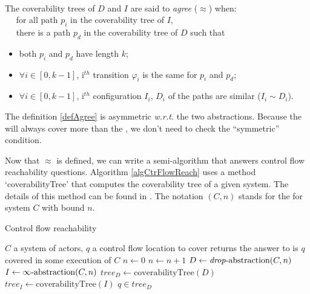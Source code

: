 \documentclass[a4paper]{report}
\numberwithin{algorithm}{chapter}
\begin{document}
\begin{define}[$\approx$] \mbox{}\\
\label{defAgree}
The coverability trees of \dabs{} $D$ and \iabs{} $I$ are said to \emph{agree} ($\approx$) when:\\
\mbox{} ~~ for all path $p_i$ in the coverability tree of $I$, \\
\mbox{} ~~ there is a path $p_d$ in the coverability tree of $D$ such that
\begin{itemize}
\item both $p_i$ and $p_d$ have length $k$;
\item $\forall i \in [0,k-1]$, i$^{th}$ transition $\varphi_i$ is the same for $p_i$ and $p_d$;
\item $\forall i \in [0,k-1]$, i$^{th}$ configuration $I_i$, $D_i$ of the paths are similar ($I_i \sim D_i$).
\end{itemize}
\end{define}

\begin{rem}
The definition \ref{defAgree} is asymmetric \emph{w.r.t.} the two abstractions.
Because the \iabs{} will always cover more than the \dabs{}, we don't need to check the ``symmetric'' condition.
\end{rem}

Now that $\approx$ is defined, we can write a semi-algorithm that answers control flow reachability questions.
Algorithm \ref{algCtrFlowReach} uses a method `coverabilityTree' that computes the coverability tree of a given system.
The details of this method can be found in \cite{DBLP:journals/jcss/KarpM69,DBLP:conf/icalp/Finkel87,DBLP:conf/apn/Finkel91}.
The notation \iabs{}$(C,n)$ stands for the \iabs{} for system $C$ with bound $n$.

\begin{algorithm}
\caption{Control flow reachability}
\label{algCtrFlowReach}
\begin{algorithmic}
\REQUIRE $C$ a system of actors, $q$ a control flow location to cover %
\ENSURE returns the answer to is $q$ covered in some execution of $C$ %
\STATE $n \leftarrow 0$
\REPEAT
\STATE $n \leftarrow n+1$
\STATE $D \leftarrow \text{\emph{drop}-abstraction{}}(C,n)$
\STATE $I \leftarrow \text{$\infty$-abstraction{}}(C,n)$
\STATE $tree_D \leftarrow \text{coverabilityTree}(D)$
\STATE $tree_I \leftarrow \text{coverabilityTree}(I)$
\RETURN $q \in tree_D$
\end{algorithmic}
\end{algorithm}
\end{document}
